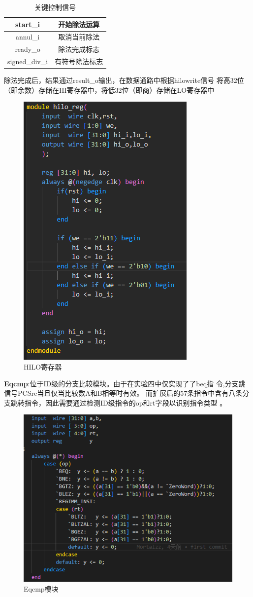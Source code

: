 \begin{table}
\centering
\begin{tabular}{|c|c|} \hline 
	start_i& 开始除法运算\\ \hline 
	annul_i& 取消当前除法\\ \hline 
	ready_o& 除法完成标志\\ \hline 
	signed_div_i& 有符号除法标志\\ \hline
\end{tabular}
\caption{关键控制信号}
\label{关键控制信号}
\end{table}

除法完成后，结果通过result\_o输出，在数据通路中根据hilowrite信号 将高32位（即余数）存储在HI寄存器中，将低32位（即商）存储在LO寄存器中

\begin{figure}
\centering
\includegraphics[width=0.5\linewidth]{image/p3.png}
\caption{HILO寄存器}
\label{fig:enter-label}
\end{figure}

\textbf{Eqcmp}:位于ID级的分支比较模块。由于在实验四中仅实现了了beq指 令,分支跳信号PCSrc当且仅当比较数A和B相等时有效。 而扩展后的57条指令中含有八条分支跳转指令，因此需要通过检测ID级指令的op和rt字段以识别指令类型 。

\begin{figure}
\centering
\includegraphics[width=0.5\linewidth]{image/p4.png}
\caption{Eqcmp模块}
\label{fig:enter-label}
\end{figure}

